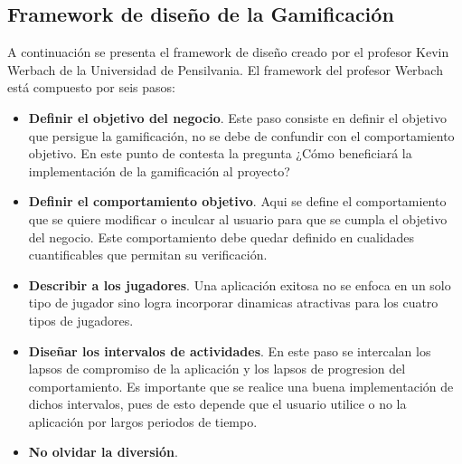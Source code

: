\subsection{Framework de diseño de la Gamificación}
A continuación se presenta el framework de diseño creado por el profesor Kevin 
Werbach de la Universidad de Pensilvania. El framework del profesor Werbach está 
compuesto por seis pasos:

\begin{itemize}
	\item \textbf{Definir el objetivo del negocio}. Este paso consiste en definir 
	el objetivo que persigue la gamificación, no se debe de confundir con el 
	comportamiento objetivo. En este punto de contesta la pregunta ¿Cómo beneficiará 
	la implementación de la gamificación al proyecto?
	\item \textbf{Definir el comportamiento objetivo}. Aqui se define el 
	comportamiento que se quiere modificar o inculcar al usuario para que se cumpla 
	el objetivo del negocio. Este comportamiento debe quedar definido en cualidades 
	cuantificables que permitan su verificación.
	\item \textbf{Describir a los jugadores}. Una aplicación exitosa no se enfoca 
	en un solo tipo de jugador sino logra incorporar dinamicas atractivas para los 
	cuatro tipos de jugadores.
	\item \textbf{Diseñar los intervalos de actividades}. En este paso se 
	intercalan los lapsos de compromiso de la aplicación y los lapsos de progresion 
	del comportamiento. Es importante que se realice una buena implementación de 
	dichos intervalos, pues de esto depende que el usuario utilice o no la 
	aplicación por largos periodos de tiempo.
	\item \textbf{No olvidar la diversión}\cite{RefIntroGamificacion}. 
\end{itemize}
